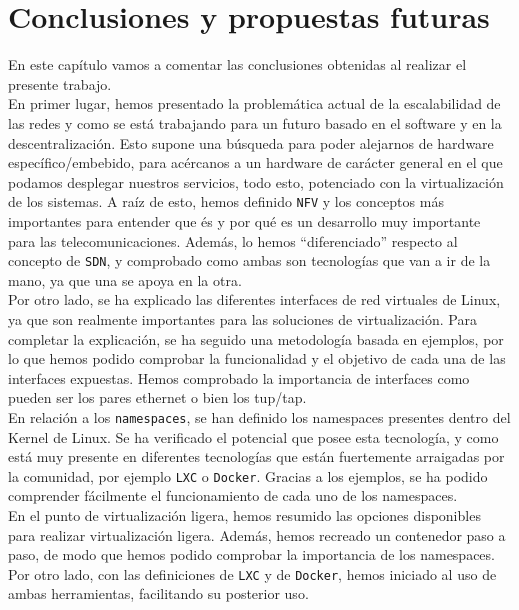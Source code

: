 \documentclass[a4paper, oneside, 12pt]{book}
\begin{document}
	\pagebreak
	
	\chapter{Conclusiones y propuestas futuras}
	
	\noindent En este capítulo vamos a comentar las conclusiones obtenidas al realizar el presente trabajo. \\
	
	\noindent En primer lugar, hemos presentado la problemática actual de la escalabilidad de las redes y como se está trabajando para un futuro basado en el software y en la descentralización. Esto supone una búsqueda para poder alejarnos de hardware específico/embebido, para acércanos a un hardware de carácter general en el que podamos desplegar nuestros servicios, todo esto, potenciado con la virtualización de los sistemas. A raíz de esto, hemos definido \texttt{NFV} y los conceptos más importantes para entender que és y por qué es un desarrollo muy importante para las telecomunicaciones. Además, lo hemos ``diferenciado'' respecto al concepto de \texttt{SDN}, y comprobado como ambas son tecnologías que van a ir de la mano, ya que una se apoya en la otra. \\
	
	\noindent Por otro lado, se ha explicado las diferentes interfaces de red virtuales de Linux, ya que son realmente importantes para las soluciones de virtualización. Para completar la explicación, se ha seguido una metodología basada en ejemplos, por lo que hemos podido comprobar la funcionalidad y el objetivo de cada una de las interfaces expuestas. Hemos comprobado la importancia de interfaces como pueden ser los pares ethernet o bien los tup/tap. \\
	
	\noindent En relación a los \texttt{namespaces}, se han definido los namespaces presentes dentro del Kernel de Linux. Se ha verificado el potencial que posee esta tecnología, y como está muy presente en diferentes tecnologías que están fuertemente arraigadas por la comunidad, por ejemplo \texttt{LXC} o \texttt{Docker}. Gracias a los ejemplos, se ha podido comprender fácilmente el funcionamiento de cada uno de los namespaces. \\
	
	\noindent En el punto de virtualización ligera, hemos resumido las opciones disponibles para realizar virtualización ligera. Además, hemos recreado un contenedor paso a paso, de modo que hemos podido comprobar la importancia de los namespaces. Por otro lado, con las definiciones de \texttt{LXC} y de \texttt{Docker}, hemos iniciado al uso de ambas herramientas, facilitando su posterior uso. \\
	
\end{document}
